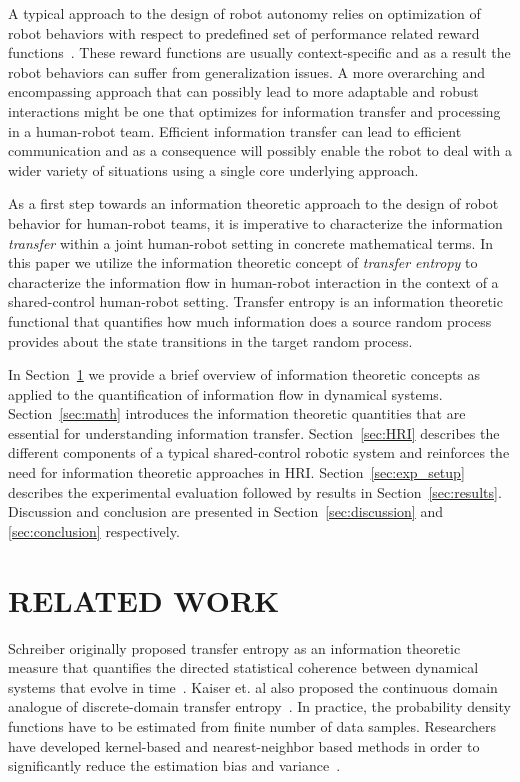 \documentclass[letterpaper, 10 pt, conference]{ieeeconf}  %
\begin{document}
A typical approach to the design of robot autonomy relies on optimization of robot behaviors with respect to predefined set of performance related reward functions~\cite{kalakrishnan2011stomp}. These reward functions are usually context-specific and as a result the robot behaviors can suffer from generalization issues. A more overarching and encompassing approach that can possibly lead to more adaptable and robust interactions might be one that optimizes for information transfer and processing in a human-robot team. Efficient information transfer can lead to efficient communication and as a consequence will possibly enable the robot to deal with a wider variety of situations using a single core underlying approach.  

As a first step towards an information theoretic approach to the design of robot behavior for human-robot teams, it is imperative to characterize the information \textit{transfer} within a joint human-robot setting in concrete mathematical terms. In this paper we utilize the information theoretic concept of \textit{transfer entropy} to characterize the information flow in human-robot interaction in the context of a shared-control human-robot setting. Transfer entropy is an information theoretic functional that quantifies how much information does a source random process provides about the state transitions in the target random process.

In Section~\ref{sec:related_work} we provide a brief overview of information theoretic concepts as applied to the quantification of information flow in dynamical systems. Section~\ref{sec:math} introduces the information theoretic quantities that are essential for understanding information transfer. Section~\ref{sec:HRI} describes the different components of a typical shared-control robotic system and reinforces the need for information theoretic approaches in HRI. Section~\ref{sec:exp_setup} describes the experimental evaluation followed by results in Section~\ref{sec:results}. Discussion and conclusion are presented in Section~\ref{sec:discussion} and \ref{sec:conclusion} respectively. 


\section{RELATED WORK}\label{sec:related_work}
 Schreiber originally proposed transfer entropy as an information theoretic measure that quantifies the directed statistical coherence between dynamical systems that evolve in time~\cite{schreiber2000measuring}. Kaiser et. al also proposed the continuous domain analogue of discrete-domain transfer entropy~\cite{kaiser2002information}. In practice, the probability density functions have to be estimated from finite number of data samples. Researchers have developed kernel-based and nearest-neighbor based methods in order to significantly reduce the estimation bias and variance~\cite{beirlant1997nonparametric}. 
\end{document}
